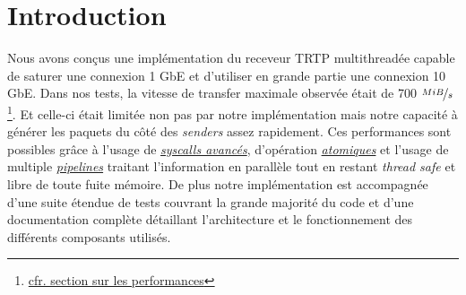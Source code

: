 \documentclass[../main.tex]{subfiles}
\begin{document}
\section{Introduction}

Nous avons conçus une implémentation du receveur TRTP multithreadée capable de saturer une connexion 1 GbE et d'utiliser en grande partie une connexion 10 GbE.
Dans nos tests, la vitesse de transfer maximale observée était de 700 $\nicefrac{MiB}{s}$\footnote{\hyperref[sec:performance]{cfr. section sur les performances}}. Et celle-ci
était limitée non pas par notre implémentation mais notre capacité à générer les paquets du côté des \textit{senders} assez rapidement. Ces performances sont possibles grâce à l'usage de
\textit{\hyperref[sec:syscalls]{syscalls avancés}}, d'opération \textit{\hyperref[sec:atomics]{atomiques}} et l'usage de multiple \textit{\hyperref[sec:pipelines]{pipelines}} traitant
l'information en parallèle tout en restant \textit{thread safe} et libre de toute fuite mémoire. De plus notre implémentation est accompagnée d'une suite
étendue de tests couvrant la grande majorité du code et d'une documentation complète détaillant l'architecture et le fonctionnement des différents composants
utilisés.
\end{document}
